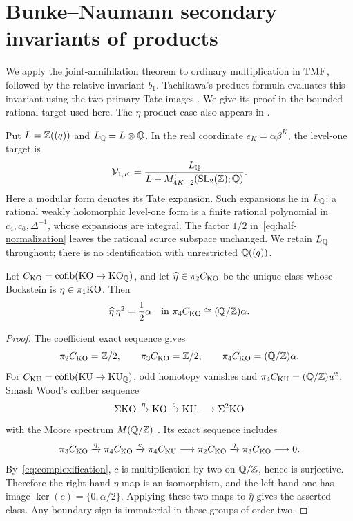 \section{Bunke--Naumann secondary invariants of products}\label{sec:products}

We apply the joint-annihilation theorem to ordinary multiplication in
$\mathrm{TMF}$, followed by the relative invariant $b_1$. Tachikawa's product
formula evaluates this invariant using the two primary Tate images
\cite[Proposition~1.1 and Section~1.3]{Tachikawa}.
We give its proof in the bounded rational target used here. The
$\eta$-product case also appears in
\cite[Section~3.1, equation~(3.5)]{TYYmod2}.

Put $L=\mathbb Z((q))$ and $L_\mathbb Q=L\otimes\mathbb Q$. In the real coordinate
$e_K=\alpha\beta^K$, the level-one target is
\begin{equation}\label{eq:bounded-product-target}
 \mathcal V_{1,K}=\frac{L_\mathbb Q}
 {L+M_{4K+2}^{!}(\mathrm{SL}_2(\mathbb Z);\mathbb Q)}.
\end{equation}
Here a modular form denotes its Tate expansion. Such expansions lie
in $L_\mathbb Q$: a rational weakly holomorphic level-one form is a finite
rational polynomial in $c_4,c_6,\Delta^{-1}$, whose expansions are
integral. The factor $1/2$ in~\eqref{eq:half-normalization} leaves
the rational source subspace unchanged. We retain $L_\mathbb Q$ throughout;
there is no identification with unrestricted $\mathbb Q((q))$.

\begin{lemma}\label{lem:KO-half}
Let $C_{\mathrm{KO}}=\operatorname{cofib}(\mathrm{KO}\to\mathrm{KO}_\mathbb Q)$, and let
$\widehat\eta\in\pi_2C_{\mathrm{KO}}$ be the unique class whose Bockstein
is $\eta\in\pi_1\mathrm{KO}$. Then
\[
 \widehat\eta\,\eta^2=\frac12\alpha
 \quad\text{in }\pi_4C_{\mathrm{KO}}\cong(\mathbb Q/\mathbb Z)\alpha.
\]
\end{lemma}
\begin{proof}
The coefficient exact sequence gives
\[
 \pi_2C_{\mathrm{KO}}=\mathbb Z/2,\qquad \pi_3C_{\mathrm{KO}}=\mathbb Z/2,
 \qquad \pi_4C_{\mathrm{KO}}=(\mathbb Q/\mathbb Z)\alpha.
\]
For $C_{\mathrm{KU}}=\operatorname{cofib}(\mathrm{KU}\to\mathrm{KU}_\mathbb Q)$, odd homotopy
vanishes and $\pi_4C_{\mathrm{KU}}=(\mathbb Q/\mathbb Z)u^2$.
Smash Wood's cofiber sequence
\[
 \Sigma\mathrm{KO}\xrightarrow{\eta}\mathrm{KO}\xrightarrow{c}\mathrm{KU}
       \longrightarrow\Sigma^2\mathrm{KO}
\]
with the Moore spectrum $M(\mathbb Q/\mathbb Z)$
\cite[Section~3.2, equation~(3.12)]{TYYmod2}.
Its exact sequence includes
\[
 \pi_3C_{\mathrm{KO}}\xrightarrow{\eta}\pi_4C_{\mathrm{KO}}
 \xrightarrow{c}\pi_4C_{\mathrm{KU}}\longrightarrow
 \pi_2C_{\mathrm{KO}}\xrightarrow{\eta}\pi_3C_{\mathrm{KO}}
 \longrightarrow0.
\]
By~\eqref{eq:complexification}, $c$ is multiplication by two on
$\mathbb Q/\mathbb Z$, hence is surjective. Therefore the right-hand
$\eta$-map is an isomorphism, and the left-hand one has image
$\ker(c)=\{0,\alpha/2\}$. Applying these two maps to
$\widehat\eta$ gives the asserted class. Any boundary sign is
immaterial in these groups of order two.
\end{proof}

